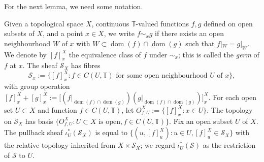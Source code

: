 \documentclass[12pt,a4paper]{amsart}
\newcommand{\field}[1]{\mathbb{#1}}
\newcommand{\TT}{\field{T}}
\newcommand{\dom}{\operatorname{dom}}
\newcommand{\Tgerms}{\mathcal{S}}
\begin{document}
For the next lemma, we need some notation.

\begin{notation+h}\label{ntn:Tgerms}
Given a topological space $X$, continuous $\TT$-valued
functions $f,g$ defined on open subsets of $X$, and a point $x
\in X$, we write $f \sim_x g$ if there exists an open
neighbourhood $W$ of $x$ with $W \subset \dom(f) \cap \dom(g)$
such that $f|_W = g|_W$. We denote by $[f]^X_x$ the equivalence
class of $f$ under $\sim_x$; this is called the \emph{germ} of
$f$ at $x$. The sheaf $\Tgerms_X$ has fibres
\[
\Tgerms_x := \{[f]^X_x : f \in C(U, \TT)\text{ for some open neighbourhood }U\text{ of }x\},
\]
with group operation $[f]^X_x + [g]^X_x := \big[(f|_{\dom(f)
\cap \dom(g)})(g|_{\dom(f) \cap \dom(g)})\big]^X_x$. For each
open set $U \subset X$ and function $f \in C(U, \TT)$, let
$O^X_{f,U} := \{[f]^X_x : x \in U\}$. The topology on
$\Tgerms_X$ has basis $\{O^X_{f,U} : U \subset X\text{ is
open}, f \in C(U, \TT)\}$. Fix an open subset $U$ of $X$. The
pullback sheaf $\iota^*_U(\Tgerms_X)$ is equal to $\{(u,
[f]^X_u) : u \in U, [f]^X_u \in \Tgerms_X\}$ with the relative
topology inherited from $X \times \Tgerms_X$; we regard
$\iota_U^*(\Tgerms)$ as the restriction of $\Tgerms$ to $U$.
\end{notation+h}
\end{document}
